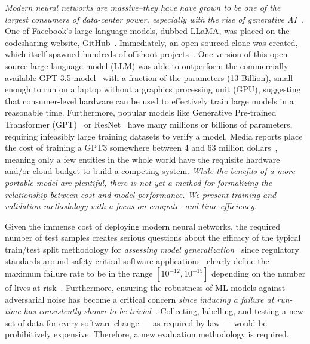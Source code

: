 \documentclass[conference]{IEEEtran}
\newcommand{\cm}[1]{\textit{{\color{blue}#1}}}
\begin{document}
\cm{Modern neural networks are massive--they have have grown to be one of the largest consumers of data-center power, especially with the rise of generative AI~\cite{msft_water}}.
One of Facebook's large language models, dubbed LLaMA, was placed on the codesharing website, GitHub~\cite{llama}. Immediately, an open-sourced clone was created, which itself spawned hundreds of offshoot projects~\cite{openllama}. One version of this open-source large language model (LLM) was able to outperform the commercially available GPT-3.5 model~\cite{liu2023goat} with a fraction of the parameters (13 Billion), small enough to run on a laptop without a graphics processing unit (GPU), suggesting that consumer-level hardware can be used to effectively train large models in a reasonable time. Furthermore, popular models like Generative Pre-trained Transformer (GPT)~\cite{floridi2020gpt} or ResNet~\cite{resnet} have many millions or billions of parameters, requiring infeasibly large training datasets to verify a model\cite{vcdimension}. Media reports place the cost of training a GPT3 somewhere between 4 and 63 million dollars~\cite{Patel_Ahmad_2023,Feswing_2023}, meaning only a few entities in the whole world have the requisite hardware and/or cloud budget to build a competing system. \cm{While the benefits of a more portable model are plentiful, there is not yet a method for formalizing the relationship between cost and model performance. We present training and validation methodology with a focus on compute- and time-efficiency.}

Given the immense cost of deploying modern neural networks, the required number of test samples creates serious questions about the efficacy of the typical train/test split methodology for \cm{assessing model generalization}~\cite{meyers} since regulatory standards around safety-critical software applications~\cite{IEC61508,iso26262,aviation_software,safetyframework} clearly define the maximum failure rate to be in the range $[10^{-12}, 10^{-15}]$ depending on the number of lives at risk~\cite{iso26262}. Furthermore, ensuring the robustness of ML models against adversarial noise has become a critical concern \cm{since inducing a failure at run-time has consistently shown to be trivial}~\cite{adversarialpatch, carlini_towards_2017, croce_reliable_2020, hopskipjump, chakraborty2018adversarial, art2018}. Collecting, labelling, and testing a new set of data for every software change --- as required by law --- would be prohibitively expensive. Therefore, a new evaluation methodology is required.
\end{document}
